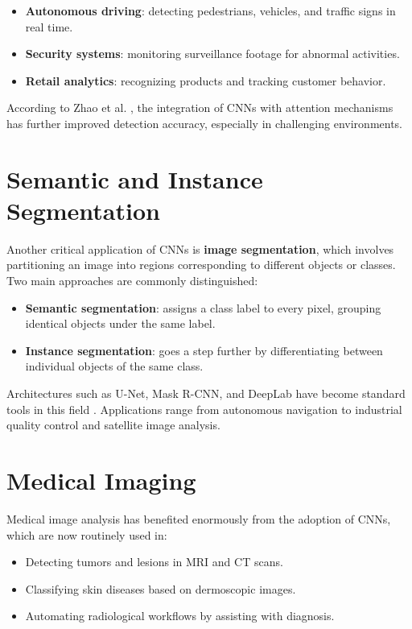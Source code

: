 \begin{itemize}
    \item \textbf{Autonomous driving}: detecting pedestrians, vehicles, and traffic signs in real time.
    \item \textbf{Security systems}: monitoring surveillance footage for abnormal activities.
    \item \textbf{Retail analytics}: recognizing products and tracking customer behavior.
\end{itemize}

According to Zhao et al. \cite{zhao2024review}, the integration of CNNs with attention mechanisms has further improved detection accuracy, especially in challenging environments.

\section{Semantic and Instance Segmentation}

Another critical application of CNNs is \textbf{image segmentation}, which involves partitioning an image into regions corresponding to different objects or classes.
Two main approaches are commonly distinguished:

\begin{itemize}
    \item \textbf{Semantic segmentation}: assigns a class label to every pixel, grouping identical objects under the same label.
    \item \textbf{Instance segmentation}: goes a step further by differentiating between individual objects of the same class.
\end{itemize}

Architectures such as U-Net, Mask R-CNN, and DeepLab have become standard tools in this field \cite{zhao2024review}. 
Applications range from autonomous navigation to industrial quality control and satellite image analysis.

\section{Medical Imaging}

Medical image analysis has benefited enormously from the adoption of CNNs, which are now routinely used in:

\begin{itemize}
    \item Detecting tumors and lesions in MRI and CT scans.
    \item Classifying skin diseases based on dermoscopic images.
    \item Automating radiological workflows by assisting with diagnosis.
\end{itemize}

